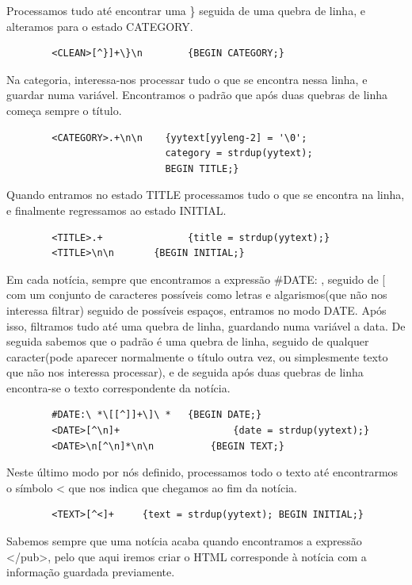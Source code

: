 \documentclass[25pt]{article}
\begin{document}
    Processamos tudo até encontrar uma \} seguida de uma quebra de linha, e alteramos para o estado CATEGORY.
    \begin{verbatim}
        <CLEAN>[^}]+\}\n	    {BEGIN CATEGORY;}
    \end{verbatim}
    Na categoria, interessa-nos processar tudo o que se encontra nessa linha, e guardar numa variável. Encontramos o padrão que após duas quebras de linha começa sempre o título.
    \begin{verbatim}
        <CATEGORY>.+\n\n    {yytext[yyleng-2] = '\0'; 
                            category = strdup(yytext); 
                            BEGIN TITLE;}
    \end{verbatim}
    Quando entramos no estado TITLE processamos tudo o que se encontra na linha, e finalmente regressamos ao estado INITIAL.
    \begin{verbatim}
        <TITLE>.+		        {title = strdup(yytext);}
        <TITLE>\n\n       {BEGIN INITIAL;}
    \end{verbatim}
    Em cada notícia, sempre que encontramos a expressão \#DATE: , seguido de [ com um conjunto de caracteres possíveis como letras e algarismos(que não nos interessa filtrar)
    seguido de possíveis espaços, entramos no modo DATE. Após isso, filtramos tudo até uma quebra de linha, guardando numa variável a data. De seguida sabemos que o padrão
    é uma quebra de linha, seguido de qualquer caracter(pode aparecer normalmente o título outra vez, ou simplesmente texto que não nos interessa processar), 
    e de seguida após duas quebras de linha encontra-se o texto correspondente da notícia.
    \begin{verbatim}
        #DATE:\ *\[[^]]+\]\ *   {BEGIN DATE;}
        <DATE>[^\n]+ 		 	        {date = strdup(yytext);}
        <DATE>\n[^\n]*\n\n 		    {BEGIN TEXT;}
    \end{verbatim}
    Neste último modo por nós definido, processamos todo o texto até encontrarmos o símbolo < que nos indica que chegamos ao fim da notícia.
    \begin{verbatim}
        <TEXT>[^<]+	    {text = strdup(yytext); BEGIN INITIAL;}
    \end{verbatim}
    Sabemos sempre que uma notícia acaba quando encontramos a expressão </pub>, pelo que aqui iremos criar o HTML corresponde à notícia com a informação guardada previamente.
\end{document}
